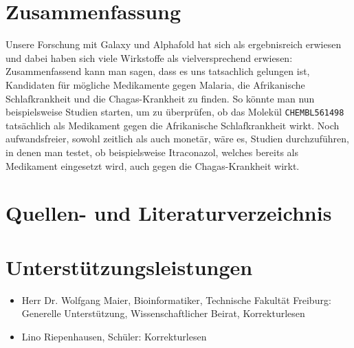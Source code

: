 \documentclass[10pt]{article}
\begin{document}
    \section{Zusammenfassung}\label{sec:zusammenfassung}
    Unsere Forschung mit Galaxy und Alphafold hat sich als ergebnisreich erwiesen und dabei haben sich viele
    Wirkstoffe als vielversprechend erwiesen: Zusammenfassend kann man sagen, dass es uns tatsachlich gelungen ist,
    Kandidaten für mögliche Medikamente gegen Malaria, die Afrikanische Schlafkrankheit und die Chagas-Krankheit zu
    finden.
    So könnte man nun beispielsweise Studien starten, um zu überprüfen, ob das Molekül \texttt{CHEMBL561498}
    tatsächlich als Medikament gegen die Afrikanische Schlafkrankheit wirkt.
    Noch aufwandsfreier, sowohl zeitlich als
    auch monetär, wäre es, Studien durchzuführen, in denen man testet, ob beispielsweise Itraconazol, welches bereits
    als Medikament eingesetzt wird, auch gegen die Chagas-Krankheit wirkt.


    \section{Quellen- und Literaturverzeichnis}\label{sec:quellen--und-literaturverzeichnis}
    


    \section{Unterstützungsleistungen}\label{sec:unterstuetzungsleistungen}

    \begin{itemize}
        \item Herr Dr. Wolfgang Maier, Bioinformatiker, Technische Fakultät Freiburg: Generelle Unterstützung,
        Wissenschaftlicher Beirat, Korrekturlesen

        \item Lino Riepenhausen, Schüler: Korrekturlesen
    \end{itemize}
\end{document}
